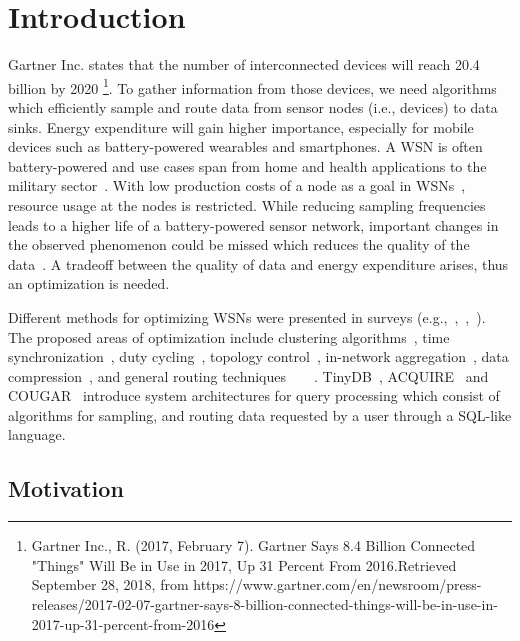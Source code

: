 \section{Introduction}
\label{sec:Introduction}
Gartner Inc. states that the number of interconnected devices will reach 20.4 billion by 2020 \footnote{Gartner Inc., R. (2017, February 7). Gartner Says 8.4 Billion Connected "Things" Will Be in Use in 2017, Up 31 Percent From 2016.Retrieved September 28, 2018, from https://www.gartner.com/en/newsroom/press-releases/2017-02-07-gartner-says-8-billion-connected-things-will-be-in-use-in-2017-up-31-percent-from-2016}.
To gather information from those devices, we need algorithms which efficiently sample and route data from sensor nodes (i.e., devices) to data sinks.
Energy expenditure will gain higher importance, especially for mobile devices such as battery-powered wearables and smartphones. 
A \ac{WSN} is often battery-powered and use cases span from home and health applications to the military sector~\cite{akyildiz2002wireless}. 
With low production costs of a node as a goal in \acp{WSN}~\cite{akyildiz2002wireless}, resource usage at the nodes is restricted. 
While reducing sampling frequencies leads to a higher life of a battery-powered sensor network, important changes in the observed phenomenon could be missed which reduces the quality of the data~\cite{akyildiz2002wireless}. 
A tradeoff between the quality of data and energy expenditure arises, thus an optimization is needed. \par
Different methods for optimizing \acp{WSN} were presented in surveys (e.g.,~\cite{abbasi2007survey},~\cite{sivrikaya2004time},~\cite{carrano2014survey}). 
The proposed areas of optimization include clustering algorithms~\cite{abbasi2007survey}, time synchronization~\cite{sivrikaya2004time}, duty cycling~\cite{carrano2014survey}, topology control~\cite{li2013survey}, in-network aggregation~\cite{fasolo2007network}, data compression~\cite{srisooksai2012practical}, and general routing techniques~\cite{al2004routing}~\cite{kulkarni2011particle}~\cite{singh2015survey}~\cite{rault2014energy}. 
TinyDB~\cite{madden2005tinydb}, ACQUIRE~\cite{sadagopan2003acquire} and COUGAR~\cite{yao2002cougar} introduce system architectures for query processing which consist of algorithms for sampling, and routing data requested by a user through a SQL-like language.


\subsection{Motivation}
\label{sec:motivation}

